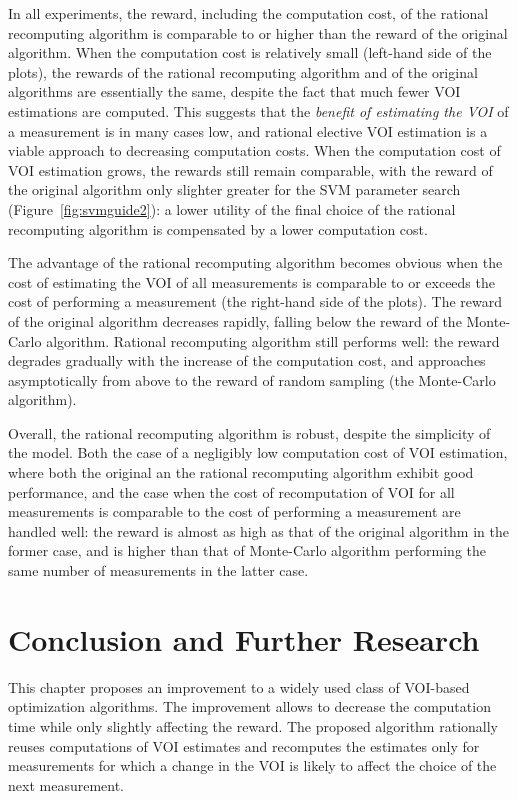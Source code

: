 In all experiments, the reward, including the computation cost, of the
rational recomputing algorithm is comparable to or higher than the
reward of the original algorithm. When the computation cost is
relatively small (left-hand side of the plots), the rewards of the
rational recomputing algorithm and of the original algorithms are
essentially the same, despite the fact that much fewer VOI estimations are
computed. This suggests that the \textit{benefit of estimating the VOI}
of a measurement is in many cases low, and rational elective VOI
estimation is a viable approach to decreasing computation costs.
When the computation cost of VOI estimation grows, the rewards still
remain comparable, with the reward of the original algorithm only
slighter greater for the SVM parameter search
(Figure~\ref{fig:svmguide2}): a lower utility of the final choice of the
rational recomputing algorithm is compensated by a lower computation
cost. 

The advantage of the rational recomputing algorithm becomes obvious
when the cost of estimating the VOI of all measurements is comparable
to or exceeds the cost of performing a measurement (the right-hand side of
the plots). The reward of the original algorithm decreases rapidly,
falling below the reward of the Monte-Carlo algorithm. Rational
recomputing algorithm still performs well: the reward degrades
gradually with the increase of the computation cost, and approaches
asymptotically from above to the reward of random sampling (the
Monte-Carlo algorithm). 

Overall, the rational recomputing algorithm is robust, despite the
simplicity of the model. Both the case of a negligibly low computation
cost of VOI estimation, where both the original an the rational
recomputing algorithm exhibit good performance, and the case when the
cost of recomputation of VOI for all measurements is comparable to the
cost of performing a measurement are handled well: the reward is
almost as high as that of the original algorithm in the former case, and is
higher than that of Monte-Carlo algorithm performing the same number of
measurements in the latter case.

\section{Conclusion and Further Research}
\label{sec:raticomp-conclusion}

This chapter proposes an improvement to a widely used class of VOI-based
optimization algorithms. The improvement allows to decrease the
computation time while only slightly affecting the reward. The
proposed algorithm rationally reuses computations of VOI estimates and
recomputes the estimates only for measurements for which a change in
the VOI is likely to affect the choice of the next
measurement.


